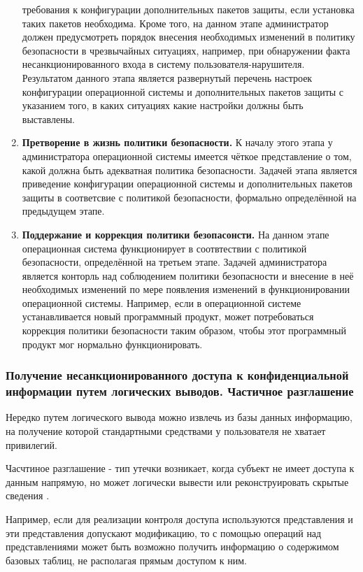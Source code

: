 \begin{enumerate}
        требования к конфигурации дополнительных пакетов защиты, если установка таких пакетов
        необходима. Кроме того, на данном этапе администратор должен предусмотреть порядок внесения
        необходимых изменений в политику безопасности в чрезвычайных ситуациях, например, при
        обнаружении факта несанкционированного входа в систему пользователя-нарушителя. Результатом
        данного этапа является развернутый перечень настроек конфигурации операционной системы и
        дополнительных пакетов защиты с указанием того, в каких ситуациях какие настройки должны быть
        выставлены.
    \item \textbf{Претворение в жизнь политики безопасности.} К началу этого этапа у администратора
        операционной системы имеется чёткое представление о том, какой должна быть адекватная политика
        безопасности. Задачей этапа является приведение конфигурации операционной системы и
        дополнительных пакетов защиты в соответсвие с политикой безопасности, формально определённой
        на предыдущем этапе.
    \item \textbf{Поддержание и коррекция политики безопасонсти.} На данном этапе операционная
    система функционирует в соотвтествии с политикой безопасности, определённой на третьем этапе.
    Задачей администратора является конторль над соблюдением политики безопасности и внесение в неё
    необходимых изменений по мере появления изменений в функционировании операционной системы.
    Например, если в операционной системе устанавливается новый программный продукт, может
    потребоваться коррекция политики безопасности таким образом, чтобы этот программный продукт мог
    нормально функционировать.
\end{enumerate}


\subsubsection{Получение несанкционированного доступа к конфиденциальной информации путем логических выводов. Частичное разглашение}
Нередко путем логического вывода можно извлечь из базы данных информацию, на получение которой
стандартными средствами у пользователя не хватает привилегий.

Часчтиное разглашение - тип утечки возникает, когда субъект не имеет доступа к данным напрямую, но может логически вывести или реконструировать скрытые сведения \cite{bdufstec}.

Например, если для реализации контроля доступа используются представления и эти представления допускают
модификацию, то с помощью операций над представлениями может быть возможно получить информацию о
содержимом базовых таблиц, не располагая прямым доступом к ним.

